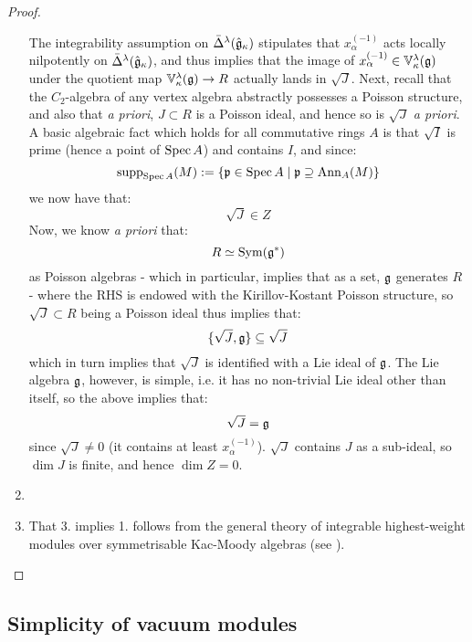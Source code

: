 \begin{proof}
\begin{enumerate}
                    The integrability assumption on $\bar{\Delta}^{\lambda}(\hat{\mathfrak{g}}_{\kappa})$ stipulates that $x_{\alpha}^{(-1)}$ acts locally nilpotently on $\bar{\Delta}^{\lambda}(\hat{\mathfrak{g}}_{\kappa})$, and thus implies that the image of $x_{\alpha}^{(-1)} \in \mathbb{V}_{\kappa}^{\lambda}(\mathfrak{g})$ under the quotient map $\mathbb{V}_{\kappa}^{\lambda}(\mathfrak{g}) \to R$ actually lands in $\sqrt{J}$. Next, recall that the $C_2$-algebra of any vertex algebra abstractly possesses a Poisson structure, and also that \textit{a priori}, $J \subset R$ is a Poisson ideal, and hence so is $\sqrt{J}$ \textit{a priori}. A basic algebraic fact which holds for all commutative rings $A$ is that $\sqrt{I}$ is prime (hence a point of $\operatorname{Spec} A$) and contains $I$, and since:
                        $$\operatorname{supp}_{\operatorname{Spec} A}(M) := \{ \mathfrak{p} \in \operatorname{Spec} A \mid \mathfrak{p} \supseteq \mathrm{Ann}_A(M) \}$$
                    we now have that:
                        $$\sqrt{J} \in Z$$
                    Now, we know \textit{a priori} that:
                        $$R \simeq \mathrm{Sym}(\mathfrak{g}^*)$$
                    as Poisson algebras - which in particular, implies that as a set, $\mathfrak{g}$ generates $R$ - where the RHS is endowed with the Kirillov-Kostant Poisson structure, so $\sqrt{J} \subset R$ being a Poisson ideal thus implies that:
                        $$\{ \sqrt{J}, \mathfrak{g} \} \subseteq \sqrt{J}$$
                    which in turn implies that $\sqrt{J}$ is identified with a Lie ideal of $\mathfrak{g}$. The Lie algebra $\mathfrak{g}$, however, is simple, i.e. it has no non-trivial Lie ideal other than itself, so the above implies that:
                        $$\sqrt{J} = \mathfrak{g}$$
                    since $\sqrt{J} \not = 0$ (it contains at least $x_{\alpha}^{(-1)}$). $\sqrt{J}$ contains $J$ as a sub-ideal, so $\dim J$ is finite, and hence $\dim Z = 0$. 
                    \item 
                    \item That 3. implies 1. follows from the general theory of integrable highest-weight modules over symmetrisable Kac-Moody algebras (see \cite{kac_infinite_dimensional_lie_algebras}).
                \end{enumerate}
            \end{proof}

    \subsection{Simplicity of vacuum modules}